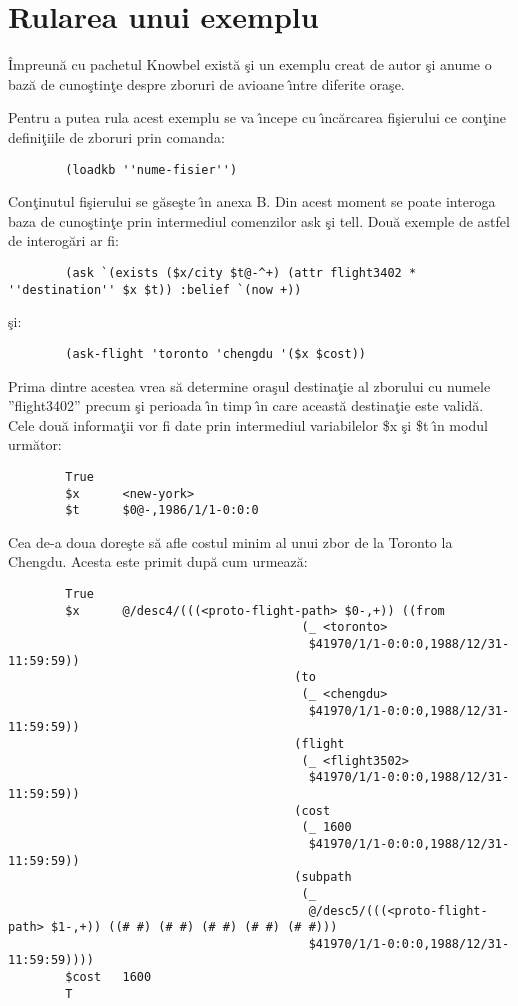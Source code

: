 \documentclass{article}
\begin{document}
\section{Rularea unui exemplu}
\^{I}mpreun\u{a} cu pachetul Knowbel exist\u{a} \c{s}i un exemplu creat
de autor \c{s}i anume o baz\u{a} de cuno\c{s}tin\c{t}e despre zboruri de
avioane \^{\i}ntre diferite ora\c{s}e.

Pentru a putea rula acest exemplu se va \^{\i}ncepe cu \^{\i}nc\u{a}rcarea
fi\c{s}ierului ce con\c{t}ine defini\c{t}iile de zboruri prin comanda:
{\scriptsize
\begin{verbatim}
        (loadkb ''nume-fisier'')
\end{verbatim}}
Con\c{t}inutul fi\c{s}ierului se g\u{a}se\c{s}te \^{\i}n anexa B. Din
acest moment se poate interoga baza de cuno\c{s}tin\c{t}e prin intermediul
comenzilor {\sc ask} \c{s}i {\sc tell}. Dou\u{a} e\-xem\-ple de astfel de interog\u{a}ri
ar fi:
{\scriptsize
\begin{verbatim}
        (ask `(exists ($x/city $t@-^+) (attr flight3402 * ''destination'' $x $t)) :belief `(now +))
\end{verbatim}}
\c{s}i:
{\scriptsize
\begin{verbatim}
        (ask-flight 'toronto 'chengdu '($x $cost))
\end{verbatim}}
Prima dintre acestea vrea s\u{a} determine ora\c{s}ul destina\c{t}ie al zborului
cu numele ''flight3402'' precum \c{s}i perioada \^{\i}n timp \^{\i}n care
aceast\u{a} destina\c{t}ie este valid\u{a}. Cele dou\u{a} informa\c{t}ii vor
fi date prin intermediul variabilelor \$x \c{s}i \$t \^{\i}n modul urm\u{a}tor:
{\scriptsize
\begin{verbatim}
        True
        $x      <new-york>
        $t      $0@-,1986/1/1-0:0:0
\end{verbatim}
}

Cea de-a doua dore\c{s}te s\u{a} afle costul minim al unui zbor de la Toronto
la Chengdu. Acesta este primit dup\u{a} cum urmeaz\u{a}:
{\scriptsize
\begin{verbatim}
        True
        $x      @/desc4/(((<proto-flight-path> $0-,+)) ((from
                                         (_ <toronto>
                                          $41970/1/1-0:0:0,1988/12/31-11:59:59))
                                        (to
                                         (_ <chengdu>
                                          $41970/1/1-0:0:0,1988/12/31-11:59:59))
                                        (flight
                                         (_ <flight3502>
                                          $41970/1/1-0:0:0,1988/12/31-11:59:59))
                                        (cost
                                         (_ 1600
                                          $41970/1/1-0:0:0,1988/12/31-11:59:59))
                                        (subpath
                                         (_
                                          @/desc5/(((<proto-flight-path> $1-,+)) ((# #) (# #) (# #) (# #) (# #)))
                                          $41970/1/1-0:0:0,1988/12/31-11:59:59))))
        $cost   1600
        T        
\end{verbatim}
}
\end{document}

